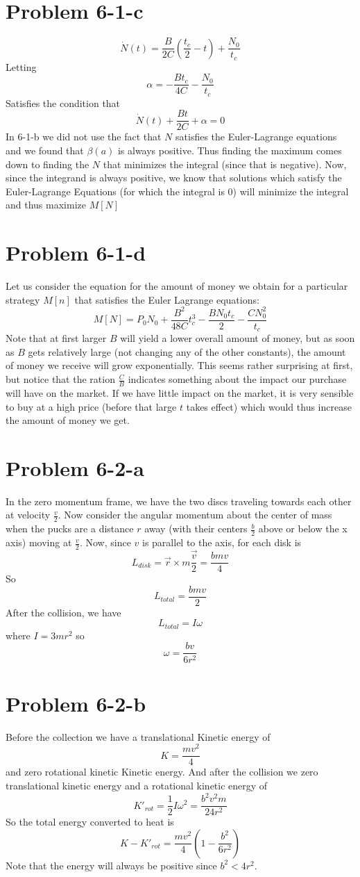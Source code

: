 \section*{Problem 6-1-c}
\[ \dot{N}(t) = \frac{B}{2C}\left(\frac{t_c}{2}-t\right) + \frac{N_0}{t_c} \]
Letting 
\[ \alpha = - \frac{B t_c}{4C} - \frac{N_0}{t_c} \]
Satisfies the condition that 
\[ \dot{N}(t)+\frac{Bt}{2C}+\alpha = 0 \]
In 6-1-b we did not use the fact that $N$ satisfies the Euler-Lagrange equations and we found that $\beta(a)$ is always positive. Thus finding the maximum comes down to finding the $N$ that minimizes the integral (since that is negative). Now, since the integrand is always positive, we know that solutions which satisfy the Euler-Lagrange Equations (for which the integral is 0) will minimize the integral and thus maximize $M[N]$
\section*{Problem 6-1-d}
Let us consider the equation for the amount of money we obtain for a particular strategy $M[n]$ that satisfies the Euler Lagrange equations:
\[ M[N] = P_0 N_0 + \frac{B^2}{48 C} t_c^3 - \frac{B N_0 t_c}{2} - \frac{C N_0^2}{t_c} \]
Note that at first larger $B$ will yield a lower overall amount of money, but as soon as $B$ gets relatively large (not changing any of the other constants), the amount of money we receive will grow exponentially. This seems rather surprising at first, but notice that the ration $\frac{C}{B}$ indicates something about the impact our purchase will have on the market. If we have little impact on the market, it is very sensible to buy at a high price (before that large $t$ takes effect) which would thus increase the amount of money we get.
\section*{Problem 6-2-a}
In the zero momentum frame, we have the two discs traveling towards each other at velocity $\frac{v}{2}$. Now consider the angular momentum about the center of mass when the pucks are a distance $r$ away (with their centers $\frac{b}{2}$ above or below the x axis) moving at $\frac{v}{2}$. Now, since $v$ is parallel to the axis, for each disk is
\[ L_{disk} = \vec{r}\times m\vec{\frac{v}{2}}  = \frac{bmv}{4} \]
So 
\[ L_{total} = \frac{bmv}{2} \]
After the collision, we have
\[ L_{total} = I\omega \]
where $I=3mr^2$ so
\[ \omega = \frac{bv}{6r^2} \]
\section*{Problem 6-2-b}
Before the collection we have a translational Kinetic energy of
\[ K = \frac{mv^2}{4} \]
and zero rotational kinetic Kinetic energy. And after the collision we zero translational kinetic energy and a rotational kinetic energy of 
\[ K'_{rot} = \frac{1}{2}I\omega^2 = \frac{b^2v^2m}{24 r^2} \]
So the total energy converted to heat is
\[ K-K'_{rot} = \frac{mv^2}{4} (1 - \frac{b^2}{6r^2}) \]
Note that the energy will always be positive since $b^2 < 4r^2$.
